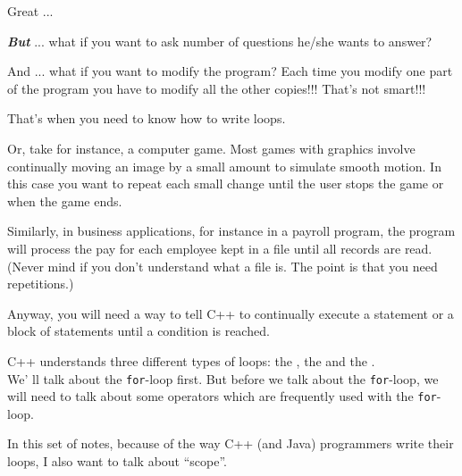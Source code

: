Great ...

\textit{\textbf{But}} ... what if you want to ask 
number of questions he/she wants to answer?

And ... what if you want to modify the program? Each time you modify
one part of the program you have to modify all the other copies!!! That's
not smart!!!

That's when you need to know how to write loops.

Or, take for instance, a computer game. Most games with graphics
involve continually moving an image by a small amount to simulate
smooth motion. In this case you want to repeat each small change until
the user stops the game or when the game ends.

Similarly, in business applications, for instance in a payroll program, the
program will process the pay for each employee kept in a file until all
records are read. (Never mind if you don't understand what a file is. The
point is that you need repetitions.)

Anyway, you will need a way to tell C++ to continually execute a
statement or a block of statements until a condition is reached.

C++ understands three different types of loops: the , the  and the .\\
We' ll talk about the \texttt{for}-loop first. But before we talk about the \texttt{for}-loop, we will need to talk about some operators which are frequently used with the \texttt{for}-loop.

In this set of notes, because of the way C++ (and Java) programmers write their loops, I also want to talk about ``scope''.

